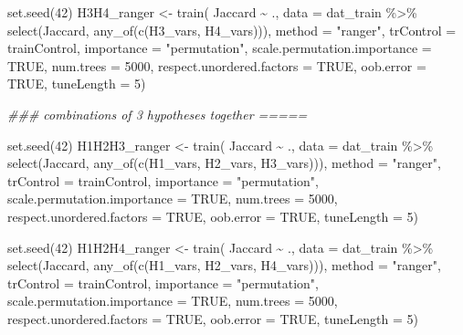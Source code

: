 \documentclass[
  letterpaper,
  DIV=11,
  numbers=noendperiod]{scrartcl}
\newenvironment{Shaded}{\begin{snugshade}}{\end{snugshade}}
\newcommand{\AttributeTok}[1]{\textcolor[rgb]{0.40,0.45,0.13}{#1}}
\newcommand{\ConstantTok}[1]{\textcolor[rgb]{0.56,0.35,0.01}{#1}}
\newcommand{\DecValTok}[1]{\textcolor[rgb]{0.68,0.00,0.00}{#1}}
\newcommand{\DocumentationTok}[1]{\textcolor[rgb]{0.37,0.37,0.37}{\textit{#1}}}
\newcommand{\FunctionTok}[1]{\textcolor[rgb]{0.28,0.35,0.67}{#1}}
\newcommand{\NormalTok}[1]{\textcolor[rgb]{0.00,0.23,0.31}{#1}}
\newcommand{\OtherTok}[1]{\textcolor[rgb]{0.00,0.23,0.31}{#1}}
\newcommand{\SpecialCharTok}[1]{\textcolor[rgb]{0.37,0.37,0.37}{#1}}
\newcommand{\StringTok}[1]{\textcolor[rgb]{0.13,0.47,0.30}{#1}}
\begin{document}
\begin{Shaded}
\begin{Highlighting}[]
\FunctionTok{set.seed}\NormalTok{(}\DecValTok{42}\NormalTok{)}
\NormalTok{H3H4\_ranger }\OtherTok{\textless{}{-}} \FunctionTok{train}\NormalTok{(}
\NormalTok{    Jaccard }\SpecialCharTok{\textasciitilde{}}\NormalTok{ .,}
    \AttributeTok{data =}\NormalTok{ dat\_train }\SpecialCharTok{\%\textgreater{}\%} \FunctionTok{select}\NormalTok{(Jaccard, }\FunctionTok{any\_of}\NormalTok{(}\FunctionTok{c}\NormalTok{(H3\_vars, H4\_vars))),}
    \AttributeTok{method =} \StringTok{"ranger"}\NormalTok{,}
    \AttributeTok{trControl =}\NormalTok{ trainControl,}
    \AttributeTok{importance =} \StringTok{"permutation"}\NormalTok{,}
    \AttributeTok{scale.permutation.importance =} \ConstantTok{TRUE}\NormalTok{,}
    \AttributeTok{num.trees =} \DecValTok{5000}\NormalTok{,}
    \AttributeTok{respect.unordered.factors =} \ConstantTok{TRUE}\NormalTok{,}
    \AttributeTok{oob.error =} \ConstantTok{TRUE}\NormalTok{,}
    \AttributeTok{tuneLength =} \DecValTok{5}\NormalTok{)}


\DocumentationTok{\#\#\# combinations of 3 hypotheses together =====}

\FunctionTok{set.seed}\NormalTok{(}\DecValTok{42}\NormalTok{)}
\NormalTok{H1H2H3\_ranger }\OtherTok{\textless{}{-}} \FunctionTok{train}\NormalTok{(}
\NormalTok{    Jaccard }\SpecialCharTok{\textasciitilde{}}\NormalTok{ .,}
    \AttributeTok{data =}\NormalTok{ dat\_train }\SpecialCharTok{\%\textgreater{}\%} \FunctionTok{select}\NormalTok{(Jaccard, }\FunctionTok{any\_of}\NormalTok{(}\FunctionTok{c}\NormalTok{(H1\_vars, H2\_vars, H3\_vars))),}
    \AttributeTok{method =} \StringTok{"ranger"}\NormalTok{,}
    \AttributeTok{trControl =}\NormalTok{ trainControl,}
    \AttributeTok{importance =} \StringTok{"permutation"}\NormalTok{,}
    \AttributeTok{scale.permutation.importance =} \ConstantTok{TRUE}\NormalTok{,}
    \AttributeTok{num.trees =} \DecValTok{5000}\NormalTok{,}
    \AttributeTok{respect.unordered.factors =} \ConstantTok{TRUE}\NormalTok{,}
    \AttributeTok{oob.error =} \ConstantTok{TRUE}\NormalTok{,}
    \AttributeTok{tuneLength =} \DecValTok{5}\NormalTok{)}

\FunctionTok{set.seed}\NormalTok{(}\DecValTok{42}\NormalTok{)}
\NormalTok{H1H2H4\_ranger }\OtherTok{\textless{}{-}} \FunctionTok{train}\NormalTok{(}
\NormalTok{    Jaccard }\SpecialCharTok{\textasciitilde{}}\NormalTok{ .,}
    \AttributeTok{data =}\NormalTok{ dat\_train }\SpecialCharTok{\%\textgreater{}\%} \FunctionTok{select}\NormalTok{(Jaccard, }\FunctionTok{any\_of}\NormalTok{(}\FunctionTok{c}\NormalTok{(H1\_vars, H2\_vars, H4\_vars))),}
    \AttributeTok{method =} \StringTok{"ranger"}\NormalTok{,}
    \AttributeTok{trControl =}\NormalTok{ trainControl,}
    \AttributeTok{importance =} \StringTok{"permutation"}\NormalTok{,}
    \AttributeTok{scale.permutation.importance =} \ConstantTok{TRUE}\NormalTok{,}
    \AttributeTok{num.trees =} \DecValTok{5000}\NormalTok{,}
    \AttributeTok{respect.unordered.factors =} \ConstantTok{TRUE}\NormalTok{,}
    \AttributeTok{oob.error =} \ConstantTok{TRUE}\NormalTok{,}
    \AttributeTok{tuneLength =} \DecValTok{5}\NormalTok{)}


\end{Highlighting}
\end{Shaded}
\end{document}
